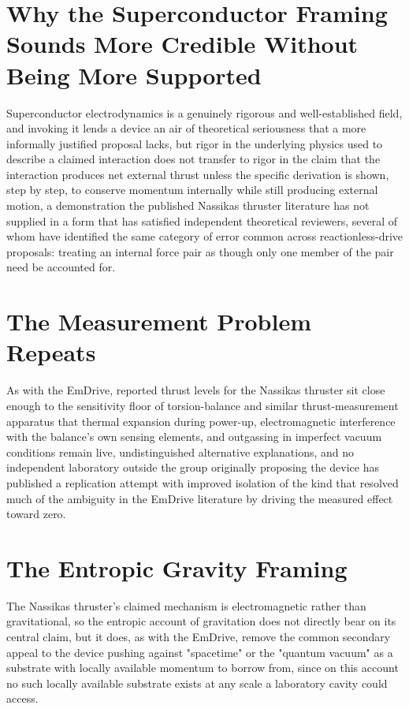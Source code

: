 \documentclass[11pt]{article}
\begin{document}
\section{Why the Superconductor Framing Sounds More Credible Without Being More Supported}

Superconductor electrodynamics is a genuinely rigorous and well-established field, and invoking it lends a device an air of theoretical seriousness that a more informally justified proposal lacks, but rigor in the underlying physics used to describe a claimed interaction does not transfer to rigor in the claim that the interaction produces net external thrust unless the specific derivation is shown, step by step, to conserve momentum internally while still producing external motion, a demonstration the published Nassikas thruster literature has not supplied in a form that has satisfied independent theoretical reviewers, several of whom have identified the same category of error common across reactionless-drive proposals: treating an internal force pair as though only one member of the pair need be accounted for.

\section{The Measurement Problem Repeats}

As with the EmDrive, reported thrust levels for the Nassikas thruster sit close enough to the sensitivity floor of torsion-balance and similar thrust-measurement apparatus that thermal expansion during power-up, electromagnetic interference with the balance's own sensing elements, and outgassing in imperfect vacuum conditions remain live, undistinguished alternative explanations, and no independent laboratory outside the group originally proposing the device has published a replication attempt with improved isolation of the kind that resolved much of the ambiguity in the EmDrive literature by driving the measured effect toward zero.

\section{The Entropic Gravity Framing}

The Nassikas thruster's claimed mechanism is electromagnetic rather than gravitational, so the entropic account of gravitation does not directly bear on its central claim, but it does, as with the EmDrive, remove the common secondary appeal to the device pushing against "spacetime" or the "quantum vacuum" as a substrate with locally available momentum to borrow from, since on this account no such locally available substrate exists at any scale a laboratory cavity could access.
\end{document}
